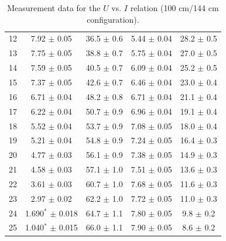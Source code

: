 \documentclass[a4paper]{article}
\begin{document}
\begin{table}[H]
\begin{tabular}{ccc||cc}
		12 & 7.92 $\pm$ 0.05              & 36.5                         $\pm$ 0.6 & 5.44                         $\pm$ 0.04  & 28.2 $\pm$ 0.5               \\
		13 & 7.75 $\pm$ 0.05              & 38.8                         $\pm$ 0.7 & 5.75                         $\pm$ 0.04  & 27.0 $\pm$ 0.5               \\
		14 & 7.59 $\pm$ 0.05              & 40.5                         $\pm$ 0.7 & 6.09                         $\pm$ 0.04  & 25.2 $\pm$ 0.5               \\
		15 & 7.37 $\pm$ 0.05              & 42.6                         $\pm$ 0.7 & 6.46                         $\pm$ 0.04  & 23.0 $\pm$ 0.4               \\
		16 & 6.71 $\pm$ 0.04              & 48.2                         $\pm$ 0.8 & 6.71                         $\pm$ 0.04  & 21.1 $\pm$ 0.4               \\
		17 & 6.22 $\pm$ 0.04              & 50.7                         $\pm$ 0.9 & 6.96                         $\pm$ 0.04  & 19.1 $\pm$ 0.4               \\
		18 & 5.52 $\pm$ 0.04              & 53.7                         $\pm$ 0.9 & 7.08                         $\pm$ 0.05  & 18.0 $\pm$ 0.4               \\
		19 & 5.21 $\pm$ 0.04              & 54.8                         $\pm$ 0.9 & 7.24                         $\pm$ 0.05  & 16.4 $\pm$ 0.3               \\
		20 & 4.77 $\pm$ 0.03              & 56.1                         $\pm$ 0.9 & 7.38                         $\pm$ 0.05  & 14.9 $\pm$ 0.3               \\
		21 & 4.58 $\pm$ 0.03              & 57.1                         $\pm$ 1.0 & 7.51                         $\pm$ 0.05  & 13.6 $\pm$ 0.3               \\
		22 & 3.61 $\pm$ 0.03              & 60.7                         $\pm$ 1.0 & 7.68                         $\pm$ 0.05  & 11.6 $\pm$ 0.3               \\
		23 & 2.97 $\pm$ 0.02              & 62.2                         $\pm$ 1.0 & 7.72                         $\pm$ 0.05  & 11.0 $\pm$ 0.3               \\
		24 & 1.690$^*$ $\pm$ 0.018             & 64.7                         $\pm$ 1.1 & 7.80                         $\pm$ 0.05  & 9.8  $\pm$ 0.2               \\
		25 & 1.040$^*$ $\pm$ 0.015             & 66.0                         $\pm$ 1.1 & 7.90                         $\pm$ 0.05  & 8.6  $\pm$ 0.2               \\
		\hline
	\end{tabular}
	\caption{Measurement data for the $U$ vs. $I$ relation (100 cm/144 cm configuration).}
	\label{table::100_144}
\end{table}
\end{document}
